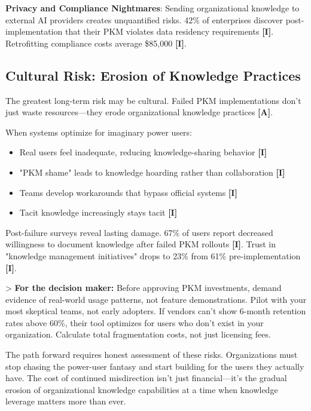 \documentclass[a4paper,11pt]{article}
\newcommand{\ilabel}{\textbf{\textcolor{icolor}{[I]}}}
\newcommand{\alabel}{\textbf{\textcolor{acolor}{[A]}}}
\begin{document}
\textbf{Privacy and Compliance Nightmares}: Sending organizational knowledge to external AI providers creates unquantified risks. 42\% of enterprises discover post-implementation that their PKM violates data residency requirements \ilabel{}. Retrofitting compliance costs average \$85,000 \ilabel{}.


\subsection{Cultural Risk: Erosion of Knowledge Practices}

The greatest long-term risk may be cultural. Failed PKM implementations don't just waste resources—they erode organizational knowledge practices \alabel{}.


When systems optimize for imaginary power users:

\begin{itemize}
  \item Real users feel inadequate, reducing knowledge-sharing behavior \ilabel{}
  \item "PKM shame" leads to knowledge hoarding rather than collaboration \ilabel{}
  \item Teams develop workarounds that bypass official systems \ilabel{}
  \item Tacit knowledge increasingly stays tacit \ilabel{}
\end{itemize}

Post-failure surveys reveal lasting damage. 67\% of users report decreased willingness to document knowledge after failed PKM rollouts \ilabel{}. Trust in "knowledge management initiatives" drops to 23\% from 61\% pre-implementation \ilabel{}.


> \textbf{For the decision maker:} Before approving PKM investments, demand evidence of real-world usage patterns, not feature demonstrations. Pilot with your most skeptical teams, not early adopters. If vendors can't show 6-month retention rates above 60\%, their tool optimizes for users who don't exist in your organization. Calculate total fragmentation costs, not just licensing fees.


The path forward requires honest assessment of these risks. Organizations must stop chasing the power-user fantasy and start building for the users they actually have. The cost of continued misdirection isn't just financial—it's the gradual erosion of organizational knowledge capabilities at a time when knowledge leverage matters more than ever.
\end{document}
